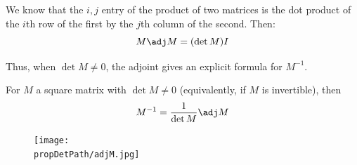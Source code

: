 We know that the $i,j$ entry of the product of two matrices is the dot product of the $i$th row of the first by the $j$th column of the second.  Then:
\[
M\adj M = (\det M) I
\]

Thus, when $\det M\neq 0$, the adjoint gives an explicit formula for $M^{-1}$.


\begin{theorem}
For $M$ a square matrix with $\det M\neq 0$ (equivalently, if $M$ is invertible), then
\[
M^{-1}=\frac{1}{\det M}\adj M
\]
\end{theorem}



\begin{figure}
\begin{center}
\texttt{[image: \\propDetPath/adjM.jpg]}
\end{center}
\end{figure}

